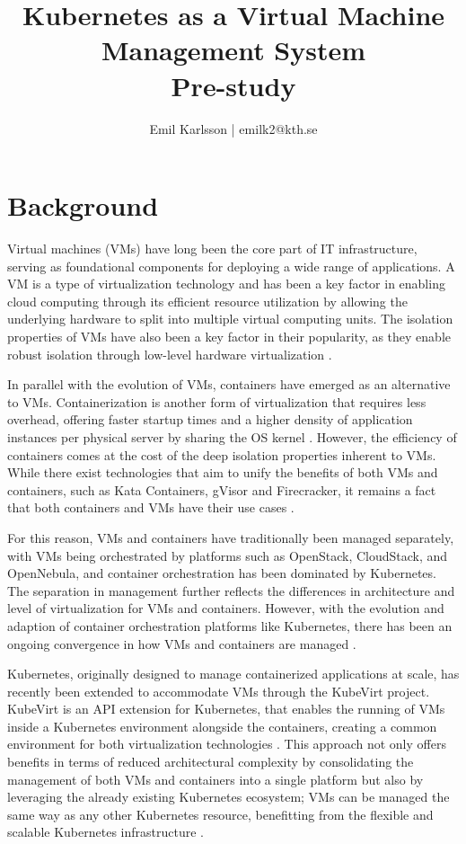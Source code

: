 \documentclass{article}
\title{%
    Kubernetes as a Virtual Machine Management System \\
    \large Pre-study \\
}
\author{Emil Karlsson | emilk2@kth.se}
\begin{document}
\maketitle
\section{Background}
Virtual machines (VMs) have long been the core part of IT infrastructure, serving as foundational components for deploying a wide range of applications. A VM is a type of virtualization technology and has been a key factor in enabling cloud computing through its efficient resource utilization by allowing the underlying hardware to split into multiple virtual computing units. The isolation properties of VMs have also been a key factor in their popularity, as they enable robust isolation through low-level hardware virtualization \cite{virtualization-basics}. 

In parallel with the evolution of VMs, containers have emerged as an alternative to VMs. Containerization is another form of virtualization that requires less overhead, offering faster startup times and a higher density of application instances per physical server by sharing the OS kernel \cite{container-vm-overview}. However, the efficiency of containers comes at the cost of the deep isolation properties inherent to VMs. While there exist technologies that aim to unify the benefits of both VMs and containers, such as Kata Containers, gVisor and Firecracker, it remains a fact that both containers and VMs have their use cases \cite{container-runtimes-overview}\cite{container-as-vm-comparison}. 

For this reason, VMs and containers have traditionally been managed separately, with VMs being orchestrated by platforms such as OpenStack, CloudStack, and OpenNebula, and container orchestration has been dominated by Kubernetes. The separation in management further reflects the differences in architecture and level of virtualization for VMs and containers. However, with the evolution and adaption of container orchestration platforms like Kubernetes, there has been an ongoing convergence in how VMs and containers are managed \cite{Li2023}. 

Kubernetes, originally designed to manage containerized applications at scale, has recently been extended to accommodate VMs through the KubeVirt project. KubeVirt is an API extension for Kubernetes, that enables the running of VMs inside a Kubernetes environment alongside the containers, creating a common environment for both virtualization technologies \cite{kubevirt}. This approach not only offers benefits in terms of reduced architectural complexity by consolidating the management of both VMs and containers into a single platform but also by leveraging the already existing Kubernetes ecosystem; VMs can be managed the same way as any other Kubernetes resource, benefitting from the flexible and scalable Kubernetes infrastructure \cite{kubevirt-cncf}.
\end{document}
